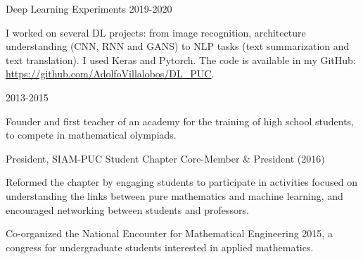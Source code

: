 
\begin{cventries}
  \cventry
  {Deep Learning Experiments}
  {}
  {}
  {2019-2020}{
  \begin{cvitems}
   \item { I worked on several DL projects: from image recognition, architecture understanding (CNN, RNN and GANS)
   to NLP tasks (text summarization and text translation). I used Keras and Pytorch.
   The code is available in my GitHub: \url{https://github.com/AdolfoVillalobos/DL_PUC}.}
  \end{cvitems}
   }


\end{cventries}

\begin{cventries}
  {}
  {}
  {2013-2015}
  {\begin{cvitems}
    \item {Founder and first teacher of an academy for the training of high school students, to compete in mathematical olympiads.}
  \end{cvitems}
}
  \cventry
  {President, SIAM-PUC Student Chapter}
  {}
  {}
  {Core-Member \& President (2016)}
  {
    \begin{cvitems}
      \item {Reformed the chapter by engaging students to participate in activities focused 
        on understanding the links between pure mathematics and machine learning,
        and encouraged networking between students and professors.}
      \item {Co-organized the National Encounter for Mathematical Engineering 2015, a congress for undergraduate students interested in applied mathematics.}
    \end{cvitems}
    }
\end{cventries}

 

